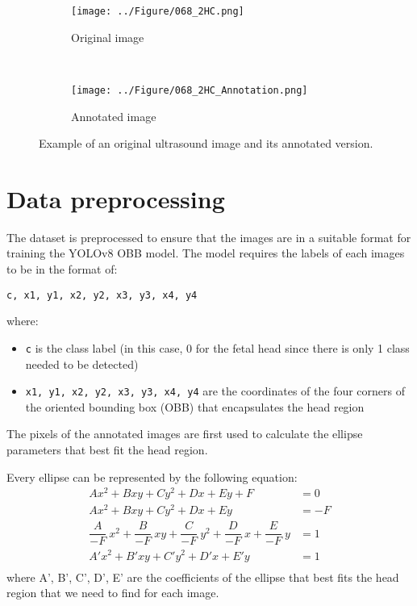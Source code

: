 \documentclass[14pt]{extreport}
\begin{document}
\begin{figure}[H]
    \captionsetup{justification=centering, margin=3.4cm}
    \begin{subfigure}{0.5\textwidth}
        \texttt{[image: ../Figure/068\_2HC.png]}
        \captionsetup{justification=justified}
        \caption{Original image}
        \label{fig:original image}
    \end{subfigure}~
    \hspace*{0.5in}
    \begin{subfigure}{0.5\textwidth}
        \texttt{[image: ../Figure/068\_2HC\_Annotation.png]}
        \centering
        \captionsetup{justification=justified}
        \caption{Annotated image}
        \label{fig:annotated image}
    \end{subfigure}
    \caption{Example of an original ultrasound image and its annotated version.}
    \label{fig:original and annotated image}
\end{figure}

\section{Data preprocessing}

The dataset is preprocessed to ensure that the images are in a suitable format for training the YOLOv8 OBB model. The model requires the labels of each images to be in the format of:

\begin{center}
    \texttt{c, x1, y1, x2, y2, x3, y3, x4, y4}
\end{center}
where:
\begin{itemize}
    \item \texttt{c} is the class label (in this case, 0 for the fetal head since there is only 1 class needed to be detected)
    \item \texttt{x1, y1, x2, y2, x3, y3, x4, y4} are the coordinates of the four corners of the oriented bounding box (OBB) that encapsulates the head region
\end{itemize}

The pixels of the annotated images are first used to calculate the ellipse parameters that best fit the head region.

Every ellipse can be represented by the following equation:
\begin{align*}
    Ax^2 + Bxy + Cy^2 + Dx + Ey + F                                                                   & = 0  \\
    Ax^2 + Bxy + Cy^2 + Dx + Ey                                                                       & = -F \\
    \dfrac{A}{-F}\ x^2 + \dfrac{B}{-F}\ xy + \dfrac{C}{-F}\ y^2 + \dfrac{D}{-F}\ x + \dfrac{E}{-F}\ y & = 1  \\
    A'x^2 + B'xy + C'y^2 + D'x + E'y                                                                  & = 1  \\
\end{align*}
where A', B', C', D', E' are the coefficients of the ellipse that best fits the head region that we need to find for each image.
\end{document}
